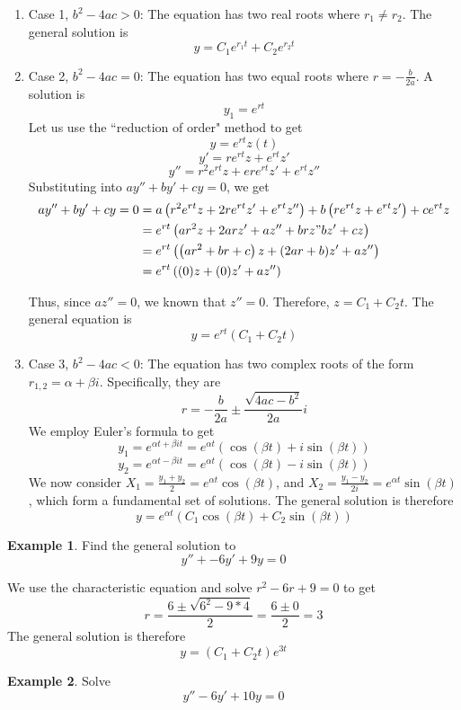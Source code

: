 \documentclass[11pt]{article}
\theoremstyle{plain} %
\theoremstyle{definition}
\theoremstyle{example}
\newtheorem*{example}{Example}
\theoremstyle{remark}
\begin{document}
\begin{enumerate}
	\item Case 1, $b^2-4ac > 0$:
	The equation has two real roots where $r_1 \neq r_2$. The general solution is $$y = C_1e^{r_1t} + C_2e^{r_2t}$$
	\item Case 2, $b^2-4ac =0$:
	The equation has two equal roots where $r=-\frac{b}{2a}$. A solution is $$y_1 = e^{rt}$$ Let us use the ``reduction of order" method to get
	$$y = e^{rt}z(t)$$
	$$y' = re^{rt}z + e^{rt}z'$$
	$$y'' = r^2e^{rt}z + ere^{rt}z' + e^{rt}z''$$
	Substituting into $ay'' + by' + cy=0$, we get
	\begin{align*}
		ay'' + by' + cy=0 &=a\left(r^2e^{rt}z + 2re^{rt}z' + e^{rt}z''\right) + b\left(re^{rt}z + e^{rt}z'\right) + ce^{rt}z \\
		&= e^{rt}\left(ar^2z+2arz'+az'' + brz"bz'+cz\right)\\
		&= e^{rt}\left(\left(ar^2+br+c\right)z + (2ar+b)z' + az''\right)\\
		&= e^{rt}\left((0)z + (0)z' + az''\right)
	\end{align*}
	
	Thus, since $az''=0$, we known that $z'' = 0$. Therefore, $z=C_1+C_2t$. The general equation  is $$y=e^{rt}\left(C_1+C_2t\right)$$
	\item Case 3, $b^2-4ac < 0$: The equation has two complex roots of the form $r_{1,2} = \alpha + \beta i$. Specifically, they are
	$$r = -\frac{b}{2a} \pm \frac{\sqrt{4ac-b^2}}{2a}i$$
	We employ Euler's formula to get 
	$$y_1  =e^{\alpha t + \beta i t} = e^{\alpha t}\left(\cos(\beta t) + i\sin(\beta t)\right)$$
	$$y_2  =e^{\alpha t - \beta i t} = e^{\alpha t}\left(\cos(\beta t) - i\sin(\beta t)\right)$$
	We now consider $X_1 = \frac{y_1+y_2}{2} = e^{\alpha t}\cos(\beta t)$, and $X_2 = \frac{y_1-y_2}{2i} = e^{\alpha t}\sin(\beta t)$, which form a fundamental set of solutions. The general solution is therefore $$y=e^{\alpha t}\left(C_1\cos(\beta t) + C_2\sin(\beta t)\right)$$
\end{enumerate}

\begin{example}
Find the general solution to $$y'' +-6y'+9y=0$$
\end{example}

We use the characteristic equation and solve $r^2-6r+9=0$ to get
$$r = \frac{6 \pm \sqrt{6^2-9*4}}{2} = \frac{6 \pm 0}{2} = 3$$
The general solution is therefore $$y=\left(C_1 + C_2t\right)e^{3t}$$

\begin{example}
Solve $$y'' -6y'+10y=0$$
\end{example}
\end{document}
